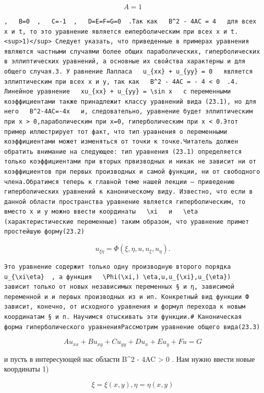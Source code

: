 \documentclass[
  ukrainian,
]{article}
\begin{document}
\[
A=1
\]

\begin{verbatim}
,   B=0  ,   C=-1  ,   D=E=F=G=0  .Так как   B^2 - 4AC = 4   для всех x и t, то это уравнение является еиперболическим при всех x и t.<sup>1)</sup> Следует указать, что приведенные в примерах уравнения являются частными случаями более общих параболических, гиперболических в эллиптических уравнений, а основные их свойства характерны и для общего случая.3. У равнение Лапласа   u_{xx} + u_{yy} = 0   является эллиптическим при всех x и y, так как   B^2 - 4AC = - 4 < 0  .4. Линейное уравнение   xu_{xx} + u_{yy} = \sin x   с переменными коэффициентами также принадлежит классу уравнений вида (23.1), но для него   B^2-4AC=-4x   и, следовательно, уравнение будет эллиптическим при x > 0,лараболическим при x=0, гиперболическим при x < 0.Этот пример иллюстрирует тот факт, что тип уравнения о переменными коэффициентами может изменяться от точки к точке.Читатель должен обратить внимание на следующее: тип уравнения (23.1) определяется только коэффициентами при вторых првизводных и никак не зависит ни от коэффициентов при первых производных и самой функции, ни от свободного члена.Обратимся теперь к главной теме нашей лекции — приведению гиперболических уравнений к каноническому виду. Известно, что если в данной области пространства уравнение является гиперболическим, то вместо x и y можно ввести координаты   \xi   и   \eta  (характеристические переменные) таким образом, что уравнение примет простейшую форму(23.2)
\end{verbatim}

\[
u_{\xi\eta} = \Phi(\xi, \eta, u, u_{\xi}, u_{\eta}).
\]

\begin{verbatim}
Это уравнение содержит только одну производную второго порядка   u_{\xi\eta}  , а функция   \Phi(\xi,) \eta,u,u_{\xi},u_{\eta})   зависит только от новых независимых переменных § и η, зависимой переменной и и первых производных из и ип. Конкретный вид функции Ф зависит, конечно, от исходного уравнения и формул перехода к новым координатам § и п. Научимся отыскивать эти функции.# Каноническая форма гиперболического уравненияРассмотрим уравнение общего вида(23.3)
\end{verbatim}

\[
Au_{xx} + Bu_{xy} + Cu_{yy} + Du_x + Eu_y + Fu = G
\]

и пусть в интересующей нас области B\^{}2 - 4AC \textgreater{} 0 . Нам
нужно ввести новые координаты 1)

\[
\xi = \xi(x, y),
\eta = \eta(x, y)
\]
\end{document}
